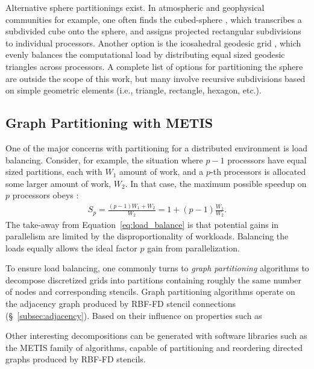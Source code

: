\documentclass{report}
\begin{document}
Alternative sphere partitionings exist. In atmospheric and geophysical communities for example, one often finds the cubed-sphere \cite{Ivan2011, Katta2012}, which transcribes a subdivided cube onto the sphere, and assigns projected rectangular subdivisions to individual processors. Another option is the icosahedral geodesic grid \cite{Randall2002}, which evenly balances the computational load by distributing equal sized geodesic triangles across processors. A complete list of options for partitioning the sphere are outside the scope of this work, but many involve recursive subdivisions based on simple geometric elements (i.e., triangle, rectangle, hexagon, etc.). 


\subsection{Graph Partitioning with METIS}

One of the major concerns with partitioning for a distributed environment is load balancing. Consider, for example, the situation where $p-1$ processors have equal sized partitions, each with $W_1$ amount of work, and a $p$-th processors is allocated some larger amount of work, $W_2$. In that case, the maximum possible speedup on $p$ processors obeys \cite{Gropp1990}:  
\begin{align}
S_p = \frac{(p-1) W_1 + W_2}{W_2} = 1 + (p-1)\frac{W_1}{W_2}.
\label{eq:load_balance}
\end{align}
The take-away from Equation~\ref{eq:load_balance} is that potential gains in parallelism are limited by the disproportionality of workloads. Balancing the loads equally allows the ideal factor $p$ gain from parallelization. 

To ensure load balancing, one commonly turns to \emph{graph partitioning} algorithms to decompose discretized grids into partitions containing roughly the same number of nodes and corresponding stencils. Graph partitioning algorithms operate on the adjacency graph produced by RBF-FD stencil connections (\S~\ref{subsec:adjacency}). Based on their influence  on properties such as 


 Other interesting decompositions can be generated with software libraries such as the METIS \cite{Karypis1999} family of algorithms, capable of partitioning and reordering directed graphs produced by RBF-FD stencils. 


\end{document}
